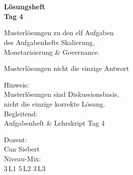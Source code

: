 \documentclass[11pt,a4paper,oneside]{article}
\begin{document}
\begin{titlepage}
  \pagestyle{empty}
  \vspace*{1.5cm}
  \\[2pt]
  \noindent{\color{lpAccent}\rule{\linewidth}{1.2pt}}\\[4pt]

  \vspace{3cm}
  {\sffamily\fontsize{30}{34}\selectfont\bfseries\color{lpInk}Lösungsheft\\Tag 4\par}

  \vspace{0.7cm}
  {\sffamily\large\color{lpGray}Musterlösungen zu den elf Aufgaben\\des Aufgabenhefts \textendash{} Skalierung,\\Monetarisierung \& Governance.\par}

  \vspace{1.5cm}
  {\caveatfont\LARGE\color{lpGreen}Musterlösungen \textperiodcentered{} nicht die einzige Antwort}\par

  \vfill

  \noindent\begin{minipage}{0.55\linewidth}
    {\sffamily\footnotesize\color{lpGray}Hinweis:}\\
    {\sffamily\small\color{lpInk}Musterlösungen sind Diskussionsbasis,\\nicht die einzige korrekte Lösung.}\\[10pt]
    {\sffamily\footnotesize\color{lpGray}Begleitend:}\\
    {\sffamily\small\color{lpInk}Aufgabenheft \& Lehrskript Tag 4}
  \end{minipage}\hfill
  \begin{minipage}{0.4\linewidth}
    \raggedleft
    {\sffamily\footnotesize\color{lpGray}Dozent:}\\
    {\sffamily\small\color{lpInk}Can Siebert}\\[10pt]
    {\sffamily\footnotesize\color{lpGray}Niveau-Mix:}\\
    {\sffamily\small\color{lpInk}3\,L1 \textperiodcentered{} 5\,L2 \textperiodcentered{} 3\,L3}
  \end{minipage}

  \vspace{0.5cm}
  \noindent{\color{lpAccent}\rule{\linewidth}{0.6pt}}
\end{titlepage}
\end{document}
